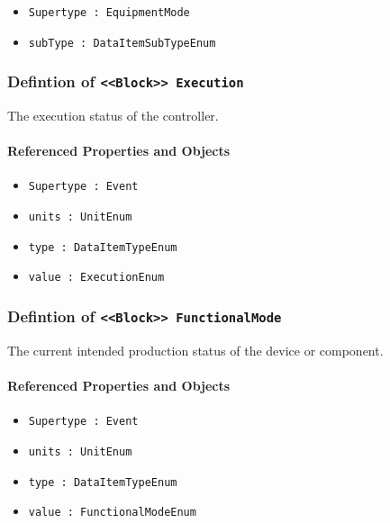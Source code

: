 \begin{itemize}
\item \texttt{Supertype : EquipmentMode}

\item \texttt{subType : DataItemSubTypeEnum}

\end{itemize}
\FloatBarrier
\subsubsection{Defintion of \texttt{<<Block>> Execution}}
  \label{type:Execution}

\FloatBarrier

The execution status of the controller.

\FloatBarrier
\paragraph{Referenced Properties and Objects}

\begin{itemize}
\item \texttt{Supertype : Event}

\item \texttt{units : UnitEnum}

\item \texttt{type : DataItemTypeEnum}

\item \texttt{value : ExecutionEnum}

\end{itemize}
\FloatBarrier
\subsubsection{Defintion of \texttt{<<Block>> FunctionalMode}}
  \label{type:FunctionalMode}

\FloatBarrier

The current intended production status of the device or component.

\FloatBarrier
\paragraph{Referenced Properties and Objects}

\begin{itemize}
\item \texttt{Supertype : Event}

\item \texttt{units : UnitEnum}

\item \texttt{type : DataItemTypeEnum}

\item \texttt{value : FunctionalModeEnum}

\end{itemize}
\FloatBarrier
